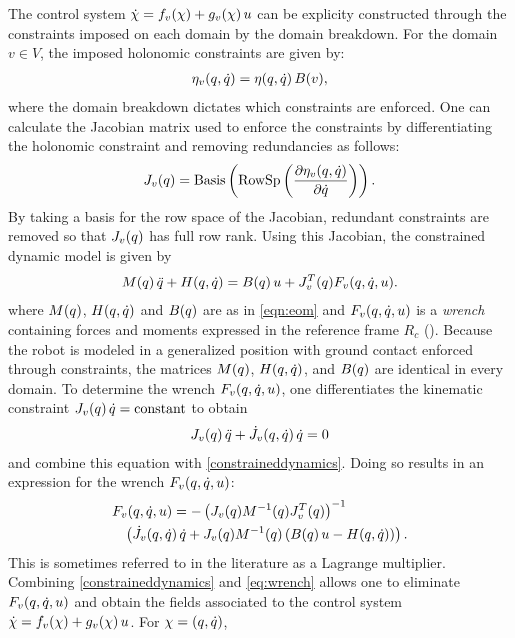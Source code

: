 The control system ${\dot {\chi}} = f_v(\chi) + g_v(\chi) \, u$ can be explicity constructed through the constraints imposed on each domain by the domain breakdown.
%
For the domain $v \in V$, the imposed holonomic constraints are given by:
%
\begin{align}
  \eta_{v}(q, \dot{q}) = \eta(q, \dot{q}) \, B(v),
\end{align}
%
where the domain breakdown dictates which constraints are enforced.
%
One can calculate the Jacobian matrix used to enforce the constraints by differentiating the holonomic constraint and removing redundancies as follows:
%
\begin{align}
  J_{v}(q) = \mathrm{Basis}\left( \mathrm{RowSp}\left( \frac{\partial{\eta_{v}(q, \dot{q})}}{\partial{{\dot{q}}}} \right) \right).
\end{align}
%
By taking a basis for the row space of the Jacobian, redundant constraints are removed so that $J_v(q)$ has full row rank.
%
Using this Jacobian, the constrained dynamic model is given by
%
\begin{align}
  \label{constraineddynamics}
  M(q) \, \ddot{q} + H(q, \dot{q}) = B(q) \, u + J_v^T(q) F_v(q, \dot{q}, u).
\end{align}
%
where $M(q)$, $H(q, \dot{q})$ and $B(q)$ are as in \eqref{eqn:eom} and $F_v(q, \dot{q}, u)$ is a {\em wrench} containing forces and moments expressed in the reference frame $R_c$ (\cite{MLS94}).
%
Because the robot is modeled in a generalized position with ground contact enforced through constraints, the matrices $M(q)$, $H(q, \dot{q})$, and $B(q)$ are identical in every domain.
%
To determine the wrench $F_v(q, \dot{q}, u)$, one differentiates the kinematic constraint $J_v(q) \, \dot{q} = \mathrm{constant}$ to obtain
%
\begin{align}
  J_{v}(q) \, \ddot{q} + {\dot J}_{v}(q, \dot{q}) \, \dot{q} = 0
\end{align}
%
and combine this equation with \eqref{constraineddynamics}.
%
Doing so results in an expression for the wrench $F_v(q, \dot{q}, u)$:
%
\begin{align}
  \label{eq:wrench}
  \lefteqn{F_{v}\argsqdqu = -\left( J_{v}\argsq \M^{-1}\argsq J_{v}^{T}\argsq \right)^{-1} }\\
  \nonumber
  &&\left( {\dot J}_{v}\argsqdq \, \dq + J_{v}\argsq \M^{-1}\argsq \left( \B\argsq \, \u - \HCor\argsqdq \right) \right).
\end{align}
%
This is sometimes referred to in the literature as a Lagrange multiplier.
%
Combining \eqref{constraineddynamics} and \eqref{eq:wrench} allows one to eliminate $F_{v}(q, \dot{q}, u)$ and obtain the fields associated to the control system ${\dot {\chi}} = f_{v}(\chi) + g_{v}(\chi) \, u$. For $\chi = (q, \dot{q})$,
